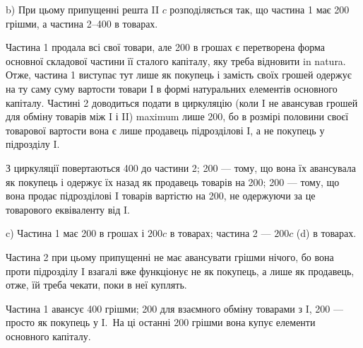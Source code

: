 b) При цьому припущенні решта II $c$ розподіляється так, що частина
1 має 200 грішми, а частина 2--400 в товарах.

Частина 1 продала всі свої товари, але 200 в грошах є перетворена
форма основної складової частини її сталого капіталу, яку треба відновити
in natura. Отже, частина 1 виступає тут лише як покупець і замість
своїх грошей одержує на ту саму суму вартости товари І в формі натуральних
елементів основного капіталу. Частині 2 доводиться подати в
циркуляцію (коли I не авансував грошей для обміну товарів між I і II)
maximum лише 200, бо в розмірі половини своєї товарової
вартости вона є лише продавець підрозділові I, а не покупець у
підрозділу I.

З циркуляції повертаються 400 до частини 2; 200 — тому,
що вона їх авансувала як покупець і одержує їх назад як продавець
товарів на 200; 200 — тому, що вона продає підрозділові I товарів вартістю
на 200, не одержуючи за це товарового еквіваленту від I.

c) Частина 1 має 200 в грошах і $200 c$ в товарах; частина 2 —
$200 c$ (d) в товарах.

Частина 2 при цьому припущенні не має авансувати грішми нічого,
бо вона проти підрозділу I взагалі вже функціонує не як покупець, а
лише як продавець, отже, їй треба чекати, поки в неї куплять.

Частина 1 авансує 400 грішми; 200 для взаємного обміну
товарами з I, 200 — просто як покупець у I.~На ці останні 200
грішми вона купує елементи основного капіталу.
